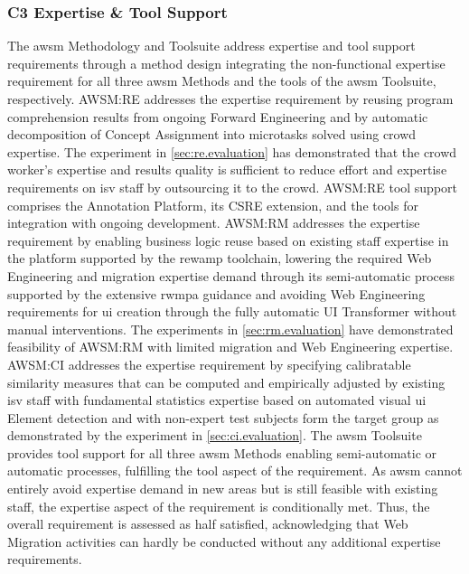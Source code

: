 \subsubsection*{C3 Expertise \& Tool Support}
The \gls{awsm} Methodology and Toolsuite address expertise and tool support requirements through a method design integrating the non-functional expertise requirement for all three \gls{awsm} Methods and the tools of the \gls{awsm} Toolsuite, respectively.
AWSM:RE addresses the expertise requirement by reusing program comprehension results from ongoing \gls{Forward Engineering} and by automatic decomposition of \gls{Concept Assignment} into microtasks solved using crowd expertise.
The experiment in \cref{sec:re.evaluation} has demonstrated that the crowd worker's expertise and results quality is sufficient to reduce effort and expertise requirements on \gls{isv} staff by outsourcing it to the crowd.
AWSM:RE tool support comprises the Annotation Platform, its CSRE extension, and the tools for integration with ongoing development.
AWSM:RM addresses the expertise requirement by enabling business logic reuse based on existing staff expertise in the  platform supported by the \gls{rewamp} toolchain, lowering the required \gls{Web Engineering} and migration expertise demand through its semi-automatic process supported by the extensive \gls{rwmpa} guidance and avoiding \gls{Web Engineering} requirements for \gls{ui} creation through the fully automatic UI Transformer without manual interventions.
The experiments in \cref{sec:rm.evaluation} have demonstrated feasibility of AWSM:RM with limited migration and \gls{Web Engineering} expertise.
AWSM:CI addresses the expertise requirement by specifying calibratable similarity measures that can be computed and empirically adjusted by existing \gls{isv} staff with fundamental statistics expertise based on automated visual \gls{ui} Element detection and with non-expert test subjects form the target group as demonstrated by the experiment in \cref{sec:ci.evaluation}.
The \gls{awsm} Toolsuite provides tool support for all three \gls{awsm} Methods enabling semi-automatic or automatic processes, fulfilling the tool aspect of the requirement.
As \gls{awsm} cannot entirely avoid expertise demand in new areas but is still feasible with existing staff, the expertise aspect of the requirement is conditionally met.
Thus, the overall requirement is assessed as half satisfied, acknowledging that \gls{Web Migration} activities can hardly be conducted without any additional expertise requirements.

